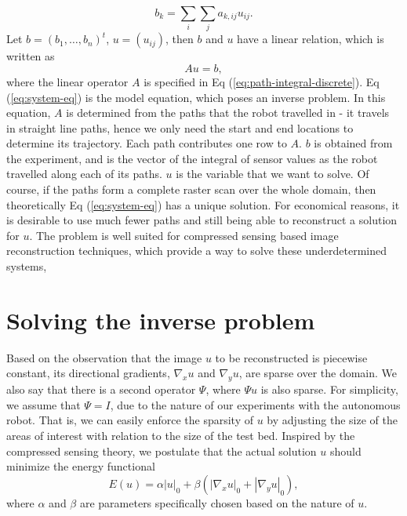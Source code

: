 \documentclass[english]{article}\usepackage[]{graphicx}\usepackage[]{color}
\begin{document}
\begin{equation}
b_{k}=\sum_{i}\sum_{j}a_{k,ij}u_{ij}.\label{eq:path-integral-discrete}
\end{equation}
Let $b=(b_{1},\ldots,b_{n})^{t}$, $u=(u_{ij})$, then $b$ and $u$
have a linear relation, which is written as 
\begin{equation}
Au=b,\label{eq:system-eq}
\end{equation}
where the linear operator $A$ is specified in Eq (\ref{eq:path-integral-discrete}).
Eq (\ref{eq:system-eq}) is the model equation, which poses an inverse
problem. In this equation, $A$ is determined from the paths that the robot travelled in - it travels in straight line paths, hence we only need the start and end locations to determine its trajectory. Each path contributes one row to $A$. $b$ is obtained from the experiment, and is the vector of the integral of sensor values as the robot travelled along each of its paths. $u$ is the variable that we want to solve.
Of course, if the paths form a complete raster scan over the whole
domain, then theoretically Eq (\ref{eq:system-eq}) has a unique solution.
For economical reasons, it is desirable to use much fewer paths and
still being able to reconstruct a solution for $u$. The problem is well suited for compressed sensing based image reconstruction techniques, which provide a way to solve these underdetermined systems, 

\section{Solving the inverse problem}

Based on the observation that the image $u$ to be reconstructed is
piecewise constant, its directional gradients, $\nabla_x u$ and $\nabla_y u$, are sparse over
the domain. We also say that there is a second operator $\Psi$, where $\Psi u$
is also sparse. For simplicity, we assume that $\Psi = I$, due to the nature 
of our experiments with the autonomous robot. That is, we can easily 
enforce the sparsity of $u$ by adjusting the size of the areas of interest with 
relation to the size of the test bed. Inspired by the compressed sensing theory, we postulate
that the actual solution $u$ should minimize the energy functional 
\[E(u) = \alpha |u|_0 + \beta\left(|\nabla_x u|_0+|\nabla_y u|_0\right),\]
where $\alpha$ and $\beta$ are parameters specifically chosen based on the nature
of $u$.
\end{document}
